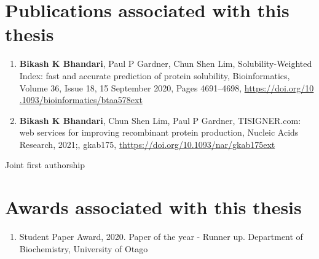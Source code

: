 \section*{Publications associated with this thesis}
\begin{enumerate}
	\item \textbf{Bikash K Bhandari}\textsuperscript{\dagger}, Paul P Gardner, Chun Shen Lim\textsuperscript{\dagger}, Solubility-Weighted Index: fast and accurate prediction of protein solubility, Bioinformatics, Volume 36, Issue 18, 15 September 2020, Pages 4691–4698, \href{https://doi.org/10.1093/bioinformatics/btaa578}{https://doi.org/10\\.1093/bioinformatics/btaa578ext}
	
	
	\item \textbf{Bikash K Bhandari}\textsuperscript{\dagger}, Chun Shen Lim\textsuperscript{\dagger}, Paul P Gardner, TISIGNER.com: web services for improving recombinant protein production, Nucleic Acids Research, 2021;, gkab175, \href{https://doi.org/10.1093/nar/gkab175}{thttps://doi.org/10.1093/nar/gkab175ext}
	
\end{enumerate}

\textsuperscript{\dagger} Joint first authorship



\section*{Awards associated with this thesis}
\begin{enumerate}
	\item Student Paper Award, 2020. Paper of the year - Runner up. Department of Biochemistry, University of Otago

\end{enumerate}